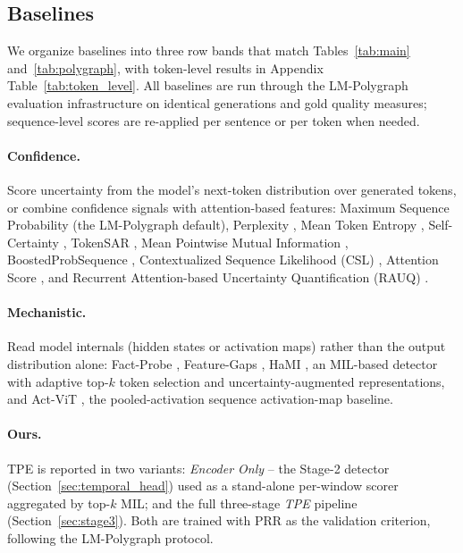 

\subsection{Baselines}
\label{sec:baselines}
We organize baselines into three row bands that match
Tables~\ref{tab:main} and~\ref{tab:polygraph}, with token-level
results in Appendix Table~\ref{tab:token_level}. All baselines are run through the
LM-Polygraph evaluation infrastructure
\citep{fadeeva2023lmpolygraph,vashurin2025lmpolygraph} on identical
generations and gold quality measures; sequence-level scores are
re-applied per sentence or per token when needed.

\paragraph{Confidence.} Score uncertainty from the model's
next-token distribution over generated tokens, or combine confidence
signals with attention-based features:
Maximum Sequence Probability (the LM-Polygraph default),
Perplexity \citep{fomicheva2020unsupervised},
Mean Token Entropy \citep{fomicheva2020unsupervised},
Self-Certainty \citep{kang2025selfcertainty},
TokenSAR \citep{duan2023},
Mean Pointwise Mutual Information \citep{takayama2019pmi},
BoostedProbSequence \citep{dinh2025boostedprob},
Contextualized Sequence Likelihood (CSL) \citep{lin2024csl},
Attention Score \citep{sriramanan2024attention}, and
Recurrent Attention-based Uncertainty Quantification (RAUQ)
\citep{vazhentsev2025rauq}.

\paragraph{Mechanistic.} Read model internals (hidden states or
activation maps) rather than the output distribution alone:
Fact-Probe \citep{han2025factprobe},
Feature-Gaps \citep{bakman2025featuregaps},
HaMI \citep{niu2025hami}, an MIL-based detector with
adaptive top-$k$ token selection and uncertainty-augmented
representations, and
Act-ViT \citep{barshalom2025}, the pooled-activation sequence
activation-map baseline.

\paragraph{Ours.} TPE is reported in two variants:
\emph{Encoder Only} -- the Stage-2 detector
(Section~\ref{sec:temporal_head}) used as a stand-alone per-window
scorer aggregated by top-$k$ MIL; and the full three-stage
\emph{TPE} pipeline (Section~\ref{sec:stage3}). Both are
trained with PRR as the validation criterion, following the
LM-Polygraph protocol.

